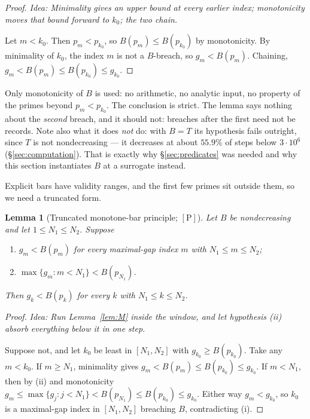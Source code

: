 \documentclass[11pt,a4paper]{article}
\theoremstyle{plain}
\newtheorem{lemma}[theorem]{Lemma}
\theoremstyle{definition}
\theoremstyle{remark}
\newcommand{\idea}[1]{\emph{Idea: #1}\par\smallskip}
\newcommand{\cP}{{[\mathrm{P}]}}
\begin{document}
\begin{proof}
\idea{Minimality gives an upper bound at every earlier index; monotonicity moves that bound
forward to $k_0$; the two chain.}
Let $m < k_0$. Then $p_m < p_{k_0}$, so $B(p_m) \le B(p_{k_0})$ by monotonicity. By
minimality of $k_0$, the index $m$ is not a $B$-breach, so $g_m < B(p_m)$. Chaining,
$g_m < B(p_m) \le B(p_{k_0}) \le g_{k_0}$.
\end{proof}

Only monotonicity of $B$ is used: no arithmetic, no analytic input, no property of the primes
beyond $p_m < p_{k_0}$. The conclusion is strict. The lemma says nothing about the
\emph{second} breach, and it should not: breaches after the first need not be records. Note
also what it does \emph{not} do: with $B = T$ its hypothesis fails outright, since $T$ is not
nondecreasing --- it decreases at about $55.9\%$ of steps below $3\cdot10^6$
(\S\ref{sec:computation}). That is exactly why \S\ref{sec:predicates} was needed and why this
section instantiates $B$ at a surrogate instead.

Explicit bars have validity ranges, and the first few primes sit outside them, so we need a
truncated form.

\begin{lemma}[Truncated monotone-bar principle; $\cP$]
\label{lem:Mprime}
Let $B$ be nondecreasing and let $1 \le N_1 \le N_2$. Suppose
\begin{enumerate}
\item[\textup{(i)}] $g_m < B(p_m)$ for every maximal-gap index $m$ with $N_1 \le m \le N_2$;
\item[\textup{(ii)}] $\max\{g_m : m < N_1\} < B(p_{N_1})$.
\end{enumerate}
Then $g_k < B(p_k)$ for every $k$ with $N_1 \le k \le N_2$.
\end{lemma}

\begin{proof}
\idea{Run Lemma~\ref{lem:M} inside the window, and let hypothesis \textup{(ii)} absorb
everything below it in one step.}
Suppose not, and let $k_0$ be least in $[N_1,N_2]$ with $g_{k_0} \ge B(p_{k_0})$. Take any
$m < k_0$. If $m \ge N_1$, minimality gives $g_m < B(p_m) \le B(p_{k_0}) \le g_{k_0}$. If
$m < N_1$, then by (ii) and monotonicity
$g_m \le \max\{g_j : j < N_1\} < B(p_{N_1}) \le B(p_{k_0}) \le g_{k_0}$. Either way
$g_m < g_{k_0}$, so $k_0$ is a maximal-gap index in $[N_1,N_2]$ breaching $B$, contradicting
(i).
\end{proof}
\end{document}
